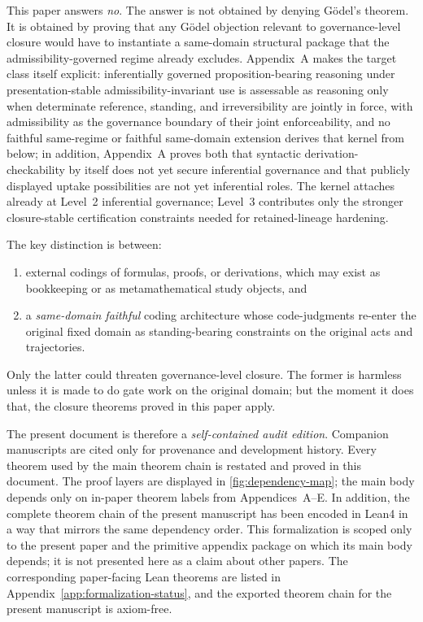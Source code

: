 \documentclass[11pt]{article}
\theoremstyle{plain}
\theoremstyle{definition}
\begin{document}
This paper answers \emph{no}. The answer is not obtained by denying G\"odel's theorem. It is obtained by proving that any G\"odel objection relevant to governance-level closure would have to instantiate a same-domain structural package that the admissibility-governed regime already excludes. Appendix~A makes the target class itself explicit: inferentially governed proposition-bearing reasoning under presentation-stable admissibility-invariant use is assessable as reasoning only when determinate reference, standing, and irreversibility are jointly in force, with admissibility as the governance boundary of their joint enforceability, and no faithful same-regime or faithful same-domain extension derives that kernel from below; in addition, Appendix~A proves both that syntactic derivation-checkability by itself does not yet secure inferential governance and that publicly displayed uptake possibilities are not yet inferential roles. The kernel attaches already at Level~2 inferential governance; Level~3 contributes only the stronger closure-stable certification constraints needed for retained-lineage hardening.

The key distinction is between:
\begin{enumerate}[label=(\alph*)]
    \item external codings of formulas, proofs, or derivations, which may exist as bookkeeping or as metamathematical study objects, and
    \item a \emph{same-domain faithful} coding architecture whose code-judgments re-enter the original fixed domain as standing-bearing constraints on the original acts and trajectories.
\end{enumerate}
Only the latter could threaten governance-level closure. The former is harmless unless it is made to do gate work on the original domain; but the moment it does that, the closure theorems proved in this paper apply.

The present document is therefore a \emph{self-contained audit edition}. Companion manuscripts are cited only for provenance and development history. Every theorem used by the main theorem chain is restated and proved in this document. The proof layers are displayed in \cref{fig:dependency-map}; the main body depends only on in-paper theorem labels from Appendices~A--E. In addition, the complete theorem chain of the present manuscript has been encoded in Lean4 in a way that mirrors the same dependency order. This formalization is scoped only to the present paper and the primitive appendix package on which its main body depends; it is not presented here as a claim about other papers. The corresponding paper-facing Lean theorems are listed in Appendix~\ref{app:formalization-status}, and the exported theorem chain for the present manuscript is axiom-free.
\end{document}
